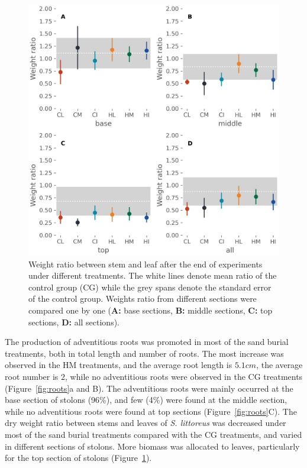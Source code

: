 \documentclass[]{interact}
\theoremstyle{plain}%
\theoremstyle{definition}
\theoremstyle{remark}
\begin{document}
\begin{figure}
  \centering
  \includegraphics[scale=0.8]{../figs/ratio.jpg}
  \caption{
    Weight ratio between stem and leaf after the end of experiments under different treatments. The white lines denote mean ratio of the control group (CG) while the grey spans denote the standard error of the control group. Weights ratio from different sections were compared one by one (\textbf{A:} base sections, \textbf{B:} middle sections, \textbf{C:} top sections, \textbf{D:} all sections).
  }
  \label{fig:ratio}
\end{figure}

The production of adventitious roots was promoted in most of the sand burial treatments, both in total length and number of roots. The most increase was observed in the HM treatments, and the average root length is $5.1cm$, the average root number is $2$, while no adventitious roots were observed in the CG treatments (Figure~\ref{fig:roots}a and B).
The adventitious roots were mainly occurred at the base section of stolons (96\%), and few (4\%) were found at the middle section, while no adventitious roots were found at top sections (Figure~\ref{fig:roots}C).
The dry weight ratio between stems and leaves of \textit{S. littoreus} was decreased under most of the sand burial treatments compared with the CG treatments, and varied in different sections of stolons. More biomass was allocated to leaves, particularly for the top section of stolons (Figure~\ref{fig:ratio}).
\end{document}
